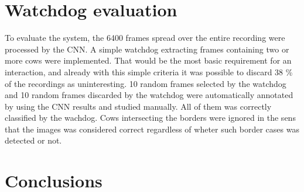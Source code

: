 \documentclass[10pt,a4paper,twocolumn]{article}
\begin{document}
\section{Watchdog evaluation}
To evaluate the system, the 6400 frames spread over the entire recording were processed by the CNN. A simple watchdog extracting frames containing two or more cows were implemented. That would be the most basic requirement for an interaction, and already with this simple criteria it was possible to discard 38 \% of the recordings as uninteresting. 10 random frames selected by the watchdog and 10 random frames discarded by the watchdog were automatically annotated by using the CNN results and studied manually. All of them was correctly classified by the wachdog. Cows intersecting the borders were ignored in the sens that the images was considered correct regardless of wheter such border cases was detected or not.

\section{Conclusions}



\end{document}
